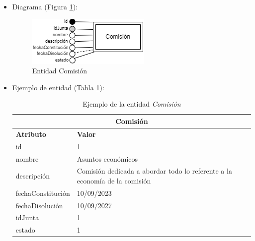 \begin{itemize}
    \item Diagrama (Figura \ref{fig:E-Comisión}):

    \begin{figure}[H]
        \centering
        \includegraphics[scale=0.8]{img/diagramas/EER/E-Comisión.png}
        \caption{Entidad Comisión}
        \label{fig:E-Comisión}
    \end{figure}

    \item Ejemplo de entidad (Tabla \ref{table:T-Comisión}):

    \begin{table}[H]
    \centering
        \begin{tabular}{ |p{6cm}||p{6cm}|  }
             \hline
                \multicolumn{2}{|c|}{\textbf{Comisión}} \\
             \hline
                 \textbf{Atributo} & \textbf{Valor} \\
             \hline
                 id & 1 \\
             \hline
                 nombre & Asuntos económicos \\
            \hline
                 descripción & Comisión dedicada a abordar todo lo referente a la economía de la comisión \\
             \hline
                 fechaConstitución & 10/09/2023 \\
             \hline
                 fechaDisolución & 10/09/2027 \\
             \hline
                 idJunta & 1 \\
             \hline
                 estado & 1 \\
        \end{tabular}
        \caption{Ejemplo de la entidad \textit{Comisión}}
        \label{table:T-Comisión}
    \end{table}
\end{itemize}


